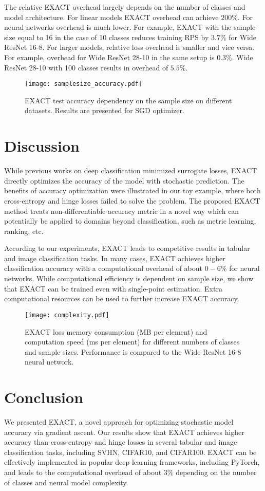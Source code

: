 \documentclass[nohyperref]{article}
\theoremstyle{plain}
\theoremstyle{definition}
\theoremstyle{remark}
\begin{document}
The relative EXACT overhead largely depends on the number of classes and model architecture. For linear models EXACT overhead can achieve $200\%$. For neural networks overhead is much lower. For example, EXACT with the sample size equal to 16 in the case of 10 classes reduces training RPS by $3.7\%$ for Wide ResNet 16-8. For larger models, relative loss overhead is smaller and vice versa. For example, overhead for Wide ResNet 28-10 in the same setup is $0.3\%$. Wide ResNet 28-10 with 100 classes results in overhead of $5.5\%$.
\begin{figure}[t]
\vskip 0.2in
\centering
\texttt{[image: samplesize\_accuracy.pdf]}
\caption{EXACT test accuracy dependency on the sample size on different datasets. Results are presented for SGD optimizer.}
\label{fig:samplesize}
\vskip -0.2in
\end{figure}
\section{Discussion}
While previous works on deep classification minimized surrogate losses, EXACT directly optimizes the accuracy of the model with stochastic prediction.
The benefits of accuracy optimization were illustrated in our toy example, where both cross-entropy and hinge losses failed to solve the problem.
The proposed EXACT method treats non-differentiable accuracy metric in a novel way which can potentially be applied to domains beyond classification, such as metric learning, ranking, etc.

According to our experiments, EXACT leads to competitive results in tabular and image classification tasks. In many cases, EXACT achieves higher classification accuracy with a computational overhead of about $0-6\%$ for neural networks. While computational efficiency is dependent on sample size, we show that EXACT can be trained even with single-point estimation. Extra computational resources can be used to further increase EXACT accuracy.
\begin{figure}[t]
\vskip 0.2in
\centering
\texttt{[image: complexity.pdf]}
\caption{EXACT loss memory consumption (MB per element) and computation speed (ms per element) for different numbers of classes and sample sizes. Performance is compared to the Wide ResNet 16-8 neural network.}
\label{fig:timememory}
\vskip -0.2in
\end{figure}
\section{Conclusion}
We presented EXACT, a novel approach for optimizing stochastic model accuracy via gradient ascent. Our results show that EXACT achieves higher accuracy than cross-entropy and hinge losses in several tabular and image classification tasks, including SVHN, CIFAR10, and CIFAR100. EXACT can be effectively implemented in popular deep learning frameworks, including PyTorch, and leads to the computational overhead of about $3\%$ depending on the number of classes and neural model complexity.
\end{document}
